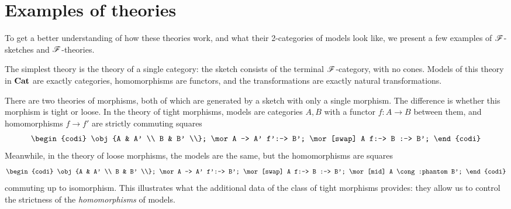 \documentclass[../thesis.tex]{subfiles}
\begin{document}
\section{Examples of theories}
To get a better understanding of how these theories work, and what their 2-categories of models look like,
we present a few examples of ${\mathscr{F}}$-sketches and ${\mathscr{F}}$-theories.

\begin{example}
  The simplest theory is the theory of a single category: the sketch consists of the terminal
  ${\mathscr{F}}$-category, with no cones. Models of this theory in ${\mathbf{Cat}}$ are exactly categories,
  homomorphisms are functors, and the transformations are exactly natural transformations.
\end{example}

\begin{example}
  There are two theories of morphisms, both of which are generated by a sketch with only a single morphism.
  The difference is whether this morphism is tight or loose. In the theory of tight morphisms, models are
  categories $A,B$ with a functor $f : A \to B$ between them, and homomorphisms $f \to f'$ are strictly
  commuting squares
  \[\begin{codi}
    \obj {A & A' \\ B & B' \\};
    \mor A -> A' f':-> B';
    \mor[swap] A f:-> B :-> B';
  \end{codi}\]
  Meanwhile, in the theory of loose morphisms, the models are the same, but the homomorphisms are squares 
  \[\begin{codi}
    \obj {A & A' \\ B & B' \\};
    \mor A -> A' f':-> B';
    \mor[swap] A f:-> B :-> B';
    \mor[mid] A \cong:phantom B';
  \end{codi}\]
  commuting up to isomorphism. This illustrates what the additional data of the class of tight morphisms
  provides: they allow us to control the strictness of the \emph{homomorphisms} of models.
\end{example}
\end{document}
